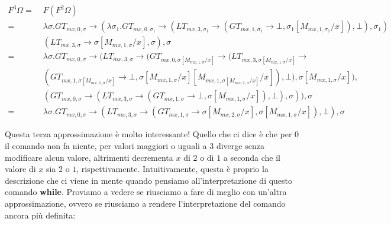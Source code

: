     \begin{align*}
        F^3\Omega =\;& F(F^2\Omega)\\
        =\;& \lambda\sigma. GT_{mx,0,\sigma} \rightarrow (\lambda\sigma_1. GT_{mx,0,\sigma_1} \rightarrow (LT_{mx,3,\sigma_1}\rightarrow (GT_{mx,1,\sigma_1} \rightarrow \bot, \sigma_1[M_{mx,1,\sigma_1}/x]), \bot), \sigma_1)\\
        &(LT_{mx,3,\sigma}\rightarrow \sigma[M_{mx,1,\sigma}/x], \sigma), \sigma\\
        =\;& \lambda\sigma. GT_{mx,0,\sigma} \rightarrow (LT_{mx,3,\sigma}\rightarrow (GT_{mx,0,\sigma[M_{mx,1,\sigma}/x]} \rightarrow (LT_{mx,3,\sigma[M_{mx,1,\sigma}/x]}\rightarrow\\
        &(GT_{mx,1,\sigma[M_{mx,1,\sigma}/x]} \rightarrow \bot, \sigma[M_{mx,1,\sigma}/x][M_{mx,1,\sigma[M_{mx,1,\sigma}/x]}/x]), \bot), \sigma[M_{mx,1,\sigma}/x]),\\
        &(GT_{mx,0,\sigma} \rightarrow (LT_{mx,3,\sigma}\rightarrow (GT_{mx,1,\sigma} \rightarrow \bot, \sigma[M_{mx,1,\sigma}/x]), \bot), \sigma)), \sigma\\
        =\;& \lambda\sigma. GT_{mx,0,\sigma} \rightarrow (LT_{mx,3,\sigma}\rightarrow (GT_{mx,1,\sigma} \rightarrow \sigma[M_{mx,2,\sigma}/x], \sigma[M_{mx,1,\sigma}/x]), \bot), \sigma
    \end{align*}
    
    Questa terza approssimazione è molto interessante! Quello che ci dice è che per $0$ il comando non fa niente, per valori maggiori o uguali a $3$ diverge senza modificare alcun valore, altrimenti decrementa $x$ di $2$ o di $1$ a seconda che il valore di $x$ sia $2$ o $1$, rispettivamente. Intuitivamente, questa è proprio la descrizione che ci viene in mente quando pensiamo all'interpretazione di questo comando \textbf{while}. Proviamo a vedere se riusciamo a fare di meglio con un'altra approssimazione, ovvero se riusciamo a rendere l'interpretazione del comando ancora più definita:
    
